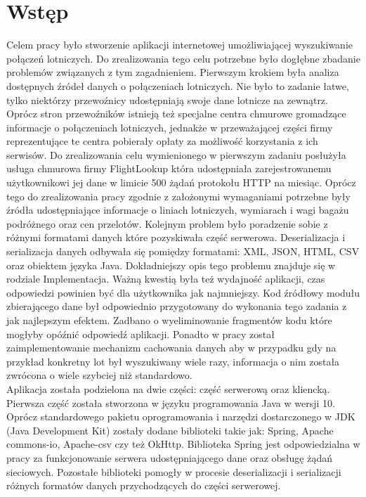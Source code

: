 \documentclass[a4paper, 12pt, twoside]{article}
\begin{document}
\section{Wstęp}
Celem pracy było stworzenie aplikacji internetowej umożliwiającej wyszukiwanie połączeń lotniczych. Do zrealizowania tego celu potrzebne było dogłębne zbadanie problemów związanych z tym zagadnieniem. Pierwszym krokiem była analiza dostępnych źródeł danych o połączeniach lotniczych. Nie było to zadanie łatwe, tylko niektórzy przewoźnicy udostępniają swoje dane lotnicze na zewnątrz. Oprócz stron przewoźników istnieją też specjalne centra chmurowe gromadzące informacje o połączeniach lotniczych, jednakże w przeważającej części firmy reprezentujące te centra pobierały opłaty za możliwość korzystania z ich serwisów. Do zrealizowania celu wymienionego w pierwszym zadaniu posłużyła usługa chmurowa firmy FlightLookup która udostępniała zarejestrowanemu użytkownikowi jej dane w limicie 500 żądań protokołu HTTP na miesiąc. Oprócz tego do zrealizowania pracy zgodnie z założonymi wymaganiami potrzebne były źródła udostępniające informacje o liniach lotniczych, wymiarach i wagi bagażu podróżnego oraz cen przelotów. Kolejnym problem było poradzenie sobie z różnymi formatami danych które pozyskiwała część serwerowa. Deserializacja i serializacja danych odbywała się pomiędzy formatami: XML, JSON, HTML, CSV oraz obiektem języka Java. Dokładniejszy opis tego problemu znajduje się w rodziale Implementacja. Ważną kwestią była też wydajność aplikacji, czas odpowiedzi powinien być dla użytkownika jak najmniejszy. Kod źródłowy modułu zbierającego dane był odpowiednio przygotowany do wykonania tego zadania z jak najlepszym efektem. Zadbano o wyeliminowanie fragmentów kodu które mogłyby opóźnić odpowiedź aplikacji. Ponadto w pracy został zaimplementowanie mechanizm cachowania danych aby w przypadku gdy na przykład konkretny lot był wyszukiwany wiele razy, informacja o nim została zwrócona o wiele szybciej niż standardowo. \\
Aplikacja została podzielona na dwie części: część serwerową oraz kliencką.
Pierwsza część została stworzona w języku programowania Java w wersji 10.
Oprócz standardowego pakietu oprogramowania i narzędzi dostarczonego w JDK (Java Development Kit) zostały dodane biblioteki takie jak: Spring, Apache commons-io, Apache-csv czy też OkHttp. Biblioteka Spring jest odpowiedzialna w pracy za funkcjonowanie serwera udostępniającego dane oraz obsługę żądań sieciowych. Pozostałe biblioteki pomogły w procesie deserializacji i serializacji różnych formatów danych przychodzących do części serwerowej.
\end{document}
